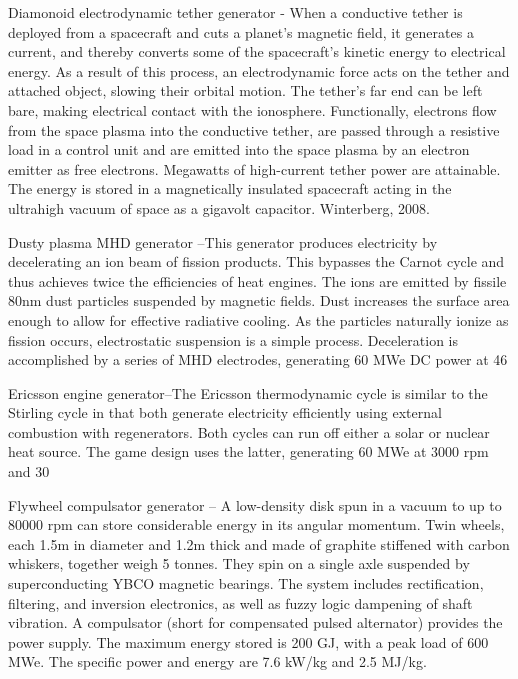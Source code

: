\documentclass[a4paper]{book}
\begin{document}
Diamonoid electrodynamic tether generator - When a conductive tether is deployed from a spacecraft and cuts a planet's magnetic field, it generates a current, and thereby converts some of the spacecraft's kinetic energy to electrical energy. As a result of this process, an electrodynamic force acts on the tether and attached object, slowing their orbital motion. The tether's far end can be left bare, making electrical contact with the ionosphere. Functionally, electrons flow from the space plasma into the conductive tether, are passed through a resistive load in a control unit and are emitted into the space plasma by an electron emitter as free electrons. Megawatts of high-current tether power are attainable. The energy is stored in a magnetically insulated spacecraft acting in the ultrahigh vacuum of space as a gigavolt capacitor. Winterberg, 2008.

Dusty plasma MHD generator –This generator produces electricity by decelerating an ion beam of fission products.  This bypasses the Carnot cycle and thus achieves twice the efficiencies of heat engines. The ions are emitted by fissile 80nm dust particles suspended by magnetic fields. Dust increases the surface area enough to allow for effective radiative cooling. As the particles naturally ionize as fission occurs, electrostatic suspension is a simple process. Deceleration is accomplished by a series of MHD electrodes, generating 60 MWe DC power at 46%

Ericsson engine generator–The Ericsson thermodynamic cycle is similar to the Stirling cycle in that both generate electricity efficiently using external combustion with regenerators. Both cycles can run off either a solar or nuclear heat source. The game design uses the latter, generating 60 MWe at 3000 rpm and 30%
 
Flywheel compulsator generator – A low-density disk spun in a vacuum to up to 80000 rpm can store considerable energy in its angular momentum.  Twin wheels, each 1.5m in diameter and 1.2m thick and made of graphite stiffened with carbon whiskers, together weigh 5 tonnes.  They spin on a single axle suspended by superconducting YBCO magnetic bearings. The system includes rectification, filtering, and inversion electronics, as well as fuzzy logic dampening of shaft vibration.  A compulsator (short for compensated pulsed alternator) provides the power supply. The maximum energy stored is 200 GJ, with a peak load of 600 MWe.  The specific power and energy are 7.6 kW/kg and 2.5 MJ/kg.
 
\end{document}
